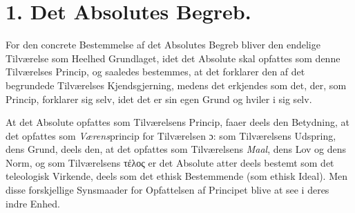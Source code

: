 \section*{1. Det Absolutes Begreb.}

For den concrete Bestemmelse af det Absolutes Begreb bliver den endelige
Tilværelse som Heelhed Grundlaget, idet
 det Absolute skal opfattes som denne Tilværelses Princip, og saaledes
bestemmes, at det forklarer den af det begrundede Tilværelses Kjendsgjerning,
medens det erkjendes som det, der, som Princip, forklarer sig selv, idet det
er sin egen Grund og hviler i sig selv.

At det Absolute opfattes som Tilværelsens Princip, faaer deels den Betydning,
at det opfattes som \emph{Værens}princip for Tilværelsen ɔ: som Tilværelsens
Udspring, dens Grund, deels den, at det opfattes som Tilværelsens
\emph{Maal}, dens Lov og dens Norm, og som Tilværelsens τέλος er det Absolute
atter deels bestemt som det teleologisk Virkende, deels som det ethisk
Bestemmende (som ethisk Ideal). Men disse forskjellige Synsmaader for
Opfattelsen af Principet blive at see i deres indre Enhed.

